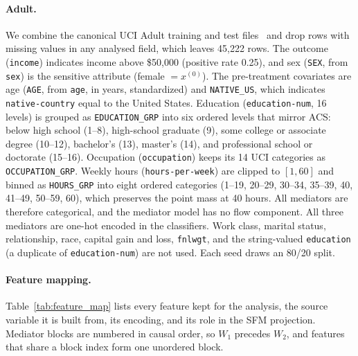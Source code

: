 \paragraph{Adult.}
We combine the canonical UCI Adult training and test files~\citep{becker1996adult}
and drop rows with missing values in any analysed field, which leaves
45{,}222 rows. The outcome (\texttt{income}) indicates income above \$50{,}000
(positive rate 0.25), and sex (\texttt{SEX}, from \texttt{sex}) is the
sensitive attribute (female $=x^{(0)}$). The pre-treatment covariates are age
(\texttt{AGE}, from \texttt{age}, in years, standardized) and
\texttt{NATIVE\_US}, which indicates \texttt{native-country} equal to the
United States. Education (\texttt{education-num}, 16 levels) is grouped as
\texttt{EDUCATION\_GRP} into six ordered levels that mirror ACS: below high
school (1--8), high-school graduate (9), some college or associate degree
(10--12), bachelor's (13), master's (14), and professional school or doctorate
(15--16). Occupation (\texttt{occupation}) keeps its 14 UCI categories as
\texttt{OCCUPATION\_GRP}. Weekly hours (\texttt{hours-per-week}) are clipped
to $[1,60]$ and binned as \texttt{HOURS\_GRP} into eight ordered categories
(1--19, 20--29, 30--34, 35--39, 40, 41--49, 50--59, 60), which preserves the
point mass at 40 hours. All mediators are therefore categorical, and the
mediator model has no flow component. All three mediators are one-hot encoded
in the classifiers. Work class, marital status, relationship, race, capital
gain and loss, \texttt{fnlwgt}, and the string-valued \texttt{education} (a
duplicate of \texttt{education-num}) are not used. Each seed draws an 80/20
split.

\paragraph{Feature mapping.}
Table~\ref{tab:feature_map} lists every feature kept for the analysis, the
source variable it is built from, its encoding, and its role in the SFM
projection. Mediator blocks are numbered in causal order, so $W_1$ precedes
$W_2$, and features that share a block index form one unordered block.

